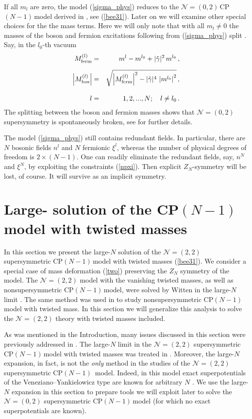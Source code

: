 \documentclass[epsfig,12pt]{article}
\def\beqn{\begin{eqnarray}}
\def\eeqn{\end{eqnarray}}
\newcommand{\nzt}{${\mathcal N}=(0,2)\,$}
\newcommand{\cpn}{CP$(N-1)\,$}
\newcommand{\zn}{$Z_N$}
\def\beqn{\begin{eqnarray}}
\def\eeqn{\end{eqnarray}}
\newcommand{\ntwot}{${\mathcal N}= \left(2,2\right) $ }
\newcommand{\ntwoo}{${\mathcal N}= \left(0,2\right) $ }
\begin{document}
If all $m_l$ are zero,  the model (\ref{sigma_phys}) reduces to the \nzt \cpn model
derived in \cite{SY1}, see (\ref{bee31}). 
Later on we will examine
other special choices for the  the mass terms. Here we will only note that
with all $m_l \neq 0$ the masses of the boson and fermion excitations following from
(\ref{sigma_phys}) split \cite{BSY3}. Say, in the $l_0$-th vacuum
\beqn
M_{\rm ferm}^{(l)} 
&=&
 m^l - m^{l_0} + |\tilde\gamma|^2\,m^{l_0} \,,
	\nonumber\\[2mm]
	\left| M_{\rm bos}^{(l)} \right|
	&=&
	\sqrt{ \left| M^{(l)}_{\rm ferm} \right|^2 - |\tilde\gamma|^4\, \left| m^{l_0}\right|^2}
	\,,
	\nonumber\\[3mm]
	l
	&=&
	 1,2, ..., N;\quad l\neq l_0\,.
\label{ferbosmasssplit}
\eeqn
The splitting between the boson and fermion masses shows that \ntwoo supersymmetry is
spontaneously broken, see \cite{BSY3} for further details.


	The model (\ref{sigma_phys}) still contains redundant fields.
	In particular, there are $N$ bosonic fields $n^l$ and $N$ fermionic $\xi^l$,
	whereas the number of physical degrees of 
	freedom is $2\times(N-1)$. 
	One can readily eliminate the redundant fields, say, $n^N$ and $\xi^N$,
	by exploiting the constraints (\ref{npxi}). Then explicit \zn-symmetry will be lost, of course.
	It will survive as an implicit symmetry.



\section{Large- solution
of the \cpn model with twisted masses}
\label{lnscptm}
\setcounter{equation}{0}

In this section we present the large-$N$ solution of the \ntwot supersymmetric \cpn model 
with twisted masses (\ref{bee31}). We consider a special case of mass deformation (\ref{two}) 
preserving the $Z_N$ symmetry of the model. 
The \ntwot  model with the vanishing twisted masses, as well as nonsupersymmetric \cpn model,
were solved by Witten in the large-$N$ limit \cite{W79}.
The same method was used in
\cite{GSYphtr} to study nonsupersymmetric \cpn 
model with twisted mass. In this section we will generalize this analysis 
to solve the \ntwot theory with twisted masses included. 

As was mentioned in the Introduction,
many issues discussed in this section were previously addressed  in 
\cite{HaHo,Dor,MR1,Ferrari}. 
The large-$N$ limit in the \ntwot supersymmetric \cpn model 
with twisted masses was treated in \cite{Ferrari}.
Moreover, the large-$N$ expansion, in fact,
 is not the {\em  only} method in the studies 
of the \ntwot supersymmetric \cpn
 model. Indeed, in this  model exact superpotentials  of the Veneziano--Yankielowicz type are known
for arbitrary $N$ \cite{AdDVecSal,ChVa,W93,HaHo,Dor}. We use the large-$N$ expansion in this
section 
to prepare tools we will exploit later to solve the \ntwoo supersymmetric \cpn model (for which no
exact superpotentials are known).
\end{document}
